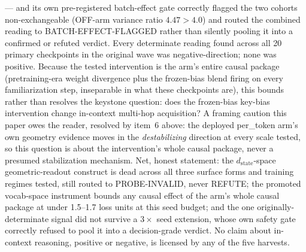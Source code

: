 \begin{enumerate}
--- and its own pre-registered batch-effect gate correctly flagged the
two cohorts non-exchangeable (OFF-arm variance ratio $4.47{>}4.0$) and
routed the combined reading to BATCH-EFFECT-FLAGGED rather than silently
pooling it into a confirmed or refuted verdict. Every determinate reading
found across all 20 primary checkpoints in the original wave was
negative-direction; none was positive. Because the tested intervention
is the arm's entire causal package (pretraining-era weight divergence
plus the frozen-bias blend firing on every familiarization step,
inseparable in what these checkpoints are), this bounds rather than
resolves the keystone question: does the frozen-bias key-bias
intervention change in-context multi-hop acquisition? A framing caution
this paper owes the reader, resolved by item~6 above: the deployed
per\_token arm's own geometry evidence moves in the \emph{destabilizing}
direction at every scale tested, so this question is about the
intervention's whole causal package, never a presumed stabilization
mechanism. Net, honest statement: the $d_{\mathrm{state}}$-space
geometric-readout construct is dead across all three surface forms and
training regimes tested, still routed to PROBE-INVALID, never REFUTE;
the promoted vocab-space instrument bounds any causal effect of the
arm's whole causal package at under 1.5--1.7 loss units at this seed
budget; and the one originally-determinate signal did not survive a
$3\times$ seed extension, whose own safety gate correctly refused to
pool it into a decision-grade verdict. No claim about in-context
reasoning, positive or negative, is licensed by any of the five
harvests.

\end{enumerate}
